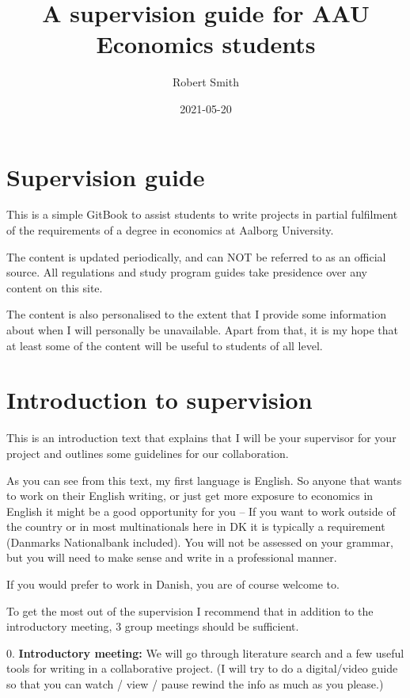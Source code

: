 \documentclass[
]{book}
\title{A supervision guide for AAU Economics students}
\author{Robert Smith}
\date{2021-05-20}
\begin{document}
\maketitle

{
\setcounter{tocdepth}{1}
\tableofcontents
}
\hypertarget{supervision-guide}{%
\chapter{Supervision guide}\label{supervision-guide}}

This is a simple GitBook to assist students to write projects in partial fulfilment of the requirements of a degree in economics at Aalborg University.

The content is updated periodically, and can NOT be referred to as an official source. All regulations and study program guides take presidence over any content on this site.

The content is also personalised to the extent that I provide some information about when I will personally be unavailable. Apart from that, it is my hope that at least some of the content will be useful to students of all level.

\hypertarget{introduction-to-supervision}{%
\chapter{Introduction to supervision}\label{introduction-to-supervision}}

This is an introduction text that explains that I will be your
supervisor for your project and outlines some guidelines for our
collaboration.

As you can see from this text, my first language is English. So anyone
that wants to work on their English writing, or just get more exposure
to economics in English it might be a good opportunity for you -- If you
want to work outside of the country or in most multinationals here in DK
it is typically a requirement (Danmarks Nationalbank included). You will
not be assessed on your grammar, but you will need to make sense and
write in a professional manner.

If you would prefer to work in Danish, you are of course welcome to.

To get the most out of the supervision I recommend that in addition to
the introductory meeting, 3 group meetings should be sufficient.

0. \textbf{Introductory meeting:} We will go through literature search and a
few useful tools for writing in a collaborative project. (I will try to
do a digital/video guide so that you can watch / view / pause rewind the
info as much as you please.)
\end{document}
